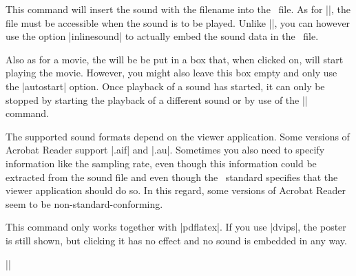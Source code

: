 \begin{command}{\sound{}}
  This command will insert the sound with the filename  into the \pdf\ file. As for |\movie|, the file must be accessible when the sound is to be played. Unlike |\movie|, you can however use the option |inlinesound| to actually embed the sound data in the \pdf\ file.

  Also as for a movie, the  will be be put in a box that, when clicked on, will start playing the movie. However, you might also leave this box empty and only use the |autostart| option. Once playback of a sound has started, it can only be stopped by starting the playback of a different sound or by use of the |\hyperlinkmute| command.

  The supported sound formats depend on the viewer application. Some versions of Acrobat Reader support |.aif| and |.au|. Sometimes you also need to specify information like the sampling rate, even though this information could be extracted from the sound file and even though the \pdf\ standard specifies that the viewer application should do so. In this regard, some versions of Acrobat Reader seem to be non-standard-conforming.

  This command only works together with |pdflatex|. If you use |dvips|, the poster is still shown, but clicking it has no effect and no sound is embedded in any way.

  \example
  ||


\end{command}

